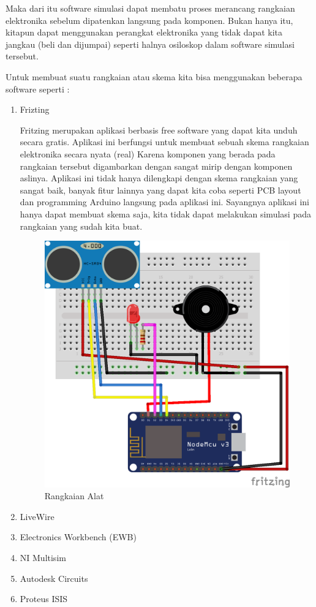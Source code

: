 \par Maka dari itu software simulasi dapat membatu proses merancang rangkaian elektronika sebelum dipatenkan langsung pada komponen. Bukan hanya itu, kitapun dapat menggunakan perangkat elektronika yang tidak dapat kita jangkau (beli dan dijumpai) seperti halnya osiloskop dalam software simulasi tersebut.
\par Untuk membuat suatu rangkaian atau skema kita bisa menggunakan beberapa software seperti :
\begin{enumerate}
    \item Frizting
    \par Fritzing merupakan aplikasi berbasis free software yang dapat kita unduh secara gratis. Aplikasi ini berfungsi untuk membuat sebuah skema rangkaian elektronika secara nyata (real) Karena komponen yang berada pada rangkaian tersebut digambarkan dengan sangat mirip dengan komponen aslinya. Aplikasi ini tidak hanya dilengkapi dengan skema rangkaian yang sangat baik, banyak fitur lainnya yang dapat kita coba seperti PCB layout dan programming Arduino langsung pada aplikasi ini. Sayangnya aplikasi ini hanya dapat membuat skema saja, kita tidak dapat melakukan simulasi pada rangkaian yang sudah kita buat.
\begin{figure}[H]
\centering
\includegraphics[width=1\textwidth]{figures/rangkaian.png}
\caption{Rangkaian Alat  }
\label{print}
\end{figure}
    
    
    \item LiveWire
    \item Electronics Workbench (EWB)
    \item NI Multisim
    \item Autodesk Circuits
    \item Proteus ISIS
\end{enumerate}



